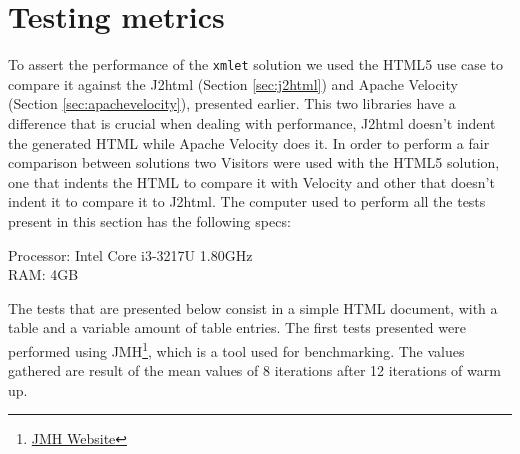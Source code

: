 \section{Testing metrics} %
\label{sec:testingmetrics}

To assert the performance of the \texttt{xmlet} solution we used the \ac{HTML}5 use case to compare it against the J2html (Section \ref{sec:j2html}) and Apache Velocity (Section \ref{sec:apachevelocity}), presented earlier. This two libraries have a difference that is crucial when dealing with performance, J2html doesn't indent the generated \ac{HTML} while Apache Velocity does it. In order to perform a fair comparison between solutions two Visitors were used with the \ac{HTML}5 solution, one that indents the \ac{HTML} to compare it with Velocity and other that doesn't indent it to compare it to J2html. The computer used to perform all the tests present in this section has the following specs:

Processor: Intel Core i3-3217U 1.80GHz\\
RAM: 4GB

\noindent
The tests that are presented below consist in a simple \ac{HTML} document, with a table and a variable amount of table entries. The first tests presented were performed using \ac{JMH}\footnote{\href{http://openjdk.java.net/projects/code-tools/jmh/}{JMH Website}}, which is a tool used for benchmarking. The values gathered are result of the mean values of 8 iterations after 12 iterations of warm up. 

